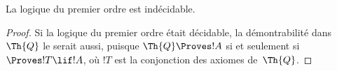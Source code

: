 \documentclass[../../../include/open-logic-section]{subfiles}
\begin{document}
\begin{cor}
La logique du premier ordre est indécidable.
\end{cor}

\begin{proof}
Si la logique du premier ordre était décidable, la
démontrabilité dans~$\Th{Q}$ le serait aussi, puisque
$\Th{Q}\Proves !A$ si et seulement si
$\Proves !T\lif !A$, où $!T$ est la conjonction des axiomes
de~$\Th{Q}$.
\end{proof}
\end{document}
